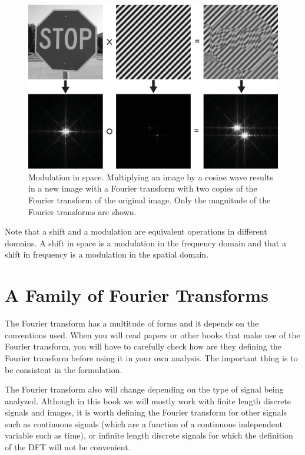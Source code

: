 \begin{figure}[t]
\centerline{
\includegraphics[width=1\linewidth]{figures/Image_processing_fourier/modulation.eps}}
\caption{Modulation in space. Multiplying an image by a cosine wave results in a new image with a Fourier transform with two copies of the Fourier transform of the original image. Only the magnitude of the Fourier transforms are shown.} 
\label{fig:modulation}
\end{figure}

Note that a shift and a modulation are equivalent operations in different domains. A shift in space is a modulation in the frequency domain and that a shift in frequency is a modulation in the spatial domain.


\section{A Family of Fourier Transforms}

The Fourier transform has a multitude of forms and it depends on the conventions used. When you will read papers or other books that make use of the Fourier transform, you will have to carefully check how are they defining the Fourier transform before using it in your own analysis. The important thing is to be consistent in the formulation. 

The Fourier transform also will change depending on the type of signal being analyzed. Although in this book we will mostly work with finite length discrete signals and images, it is worth defining the Fourier transform for other signals such as continuous signals (which are a function of a continuous independent variable such as time), or infinite length discrete signals for which the definition of the DFT will not be convenient. 


